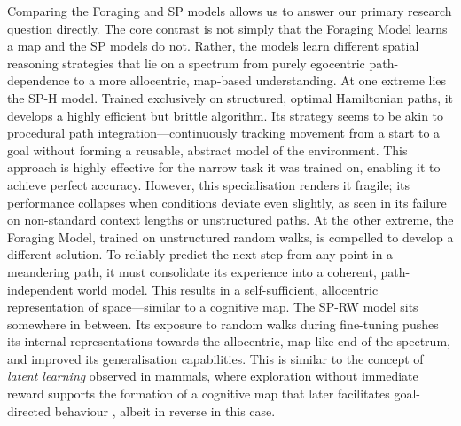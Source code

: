 Comparing the Foraging and SP models allows us to answer our primary research question directly. The core contrast is not simply that the Foraging Model learns a map and the SP models do not. Rather, the models learn different spatial reasoning strategies that lie on a spectrum from purely egocentric path-dependence to a more allocentric, map-based understanding. At one extreme lies the SP-H model. Trained exclusively on structured, optimal Hamiltonian paths, it develops a highly efficient but brittle algorithm. Its strategy seems to be akin to procedural path integration—continuously tracking movement from a start to a goal without forming a reusable, abstract model of the environment. This approach is highly effective for the narrow task it was trained on, enabling it to achieve perfect accuracy. However, this specialisation renders it fragile; its performance collapses when conditions deviate even slightly, as seen in its failure on non-standard context lengths or unstructured paths. At the other extreme, the Foraging Model, trained on unstructured random walks, is compelled to develop a different solution. To reliably predict the next step from any point in a meandering path, it must consolidate its experience into a coherent, path-independent world model. This results in a self-sufficient, allocentric representation of space—similar to a cognitive map. The SP-RW model sits somewhere in between. Its exposure to random walks during fine-tuning pushes its internal representations towards the allocentric, map-like end of the spectrum, and improved its generalisation capabilities. This is similar to the concept of \textit{latent learning} observed in mammals, where exploration without immediate reward supports the formation of a cognitive map that later facilitates goal-directed behaviour \citep{tolman1930maze,whittington2022howtobuild}, albeit in reverse in this case.


